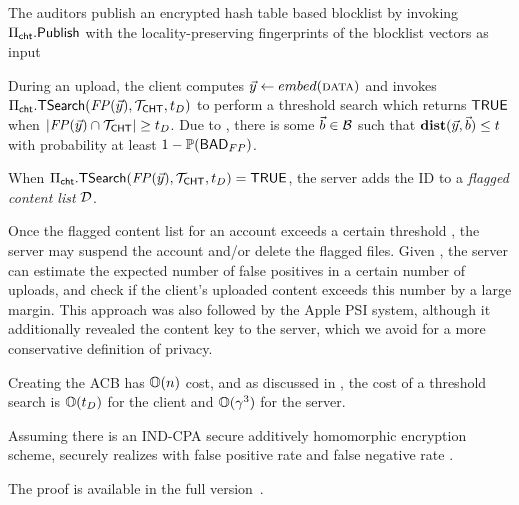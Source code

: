 \enumListStart
 
\item The auditors publish an encrypted hash table based blocklist by invoking $\Pi_{\mathsf{cht}}.\mathsf{Publish}$ with the locality-preserving fingerprints of the blocklist vectors as input
\item During an upload, the client computes $\clientVec \assign \embed(\clientData)$ and invokes $\chtACB.\thresholdSearchBlocklist(\fingerprint(\clientVec), \chtBlklistToken, \detectionThreshold)$ to perform a threshold search which returns $\mathsf{TRUE}$ when 
$|\fingerprint(\clientVec) \cap \chtBlklistToken| \ge \detectionThreshold$. Due to , there is some $\blocklistVec \in \blocklist$ such that $\hammingDist{\clientVec}{\blocklistVec} \le \threshold$ with probability at least $1 - \mathbb{P}\mathopen{}\left({\mathsf{BAD}_{FP}}\right)\mathclose{}$. 

\item When $\chtACB.\thresholdSearchBlocklist(\fingerprint(\clientVec), \chtBlklistToken, \detectionThreshold) = \tru$, the server adds the ID to a \emph{flagged content list} $\mathcal{D}$. 

\enumListEnd

Once the flagged content list for an account exceeds a certain threshold \revealThreshold, the server may suspend the account and/or delete the flagged files. Given \badFP, the server can estimate the expected number of false positives in a certain number of uploads, and check if the client's uploaded content exceeds this number by a large margin. This approach was also followed by the Apple PSI system, although it additionally revealed the content key to the server, which we avoid for a more conservative definition of privacy. 

%
Creating the ACB has $\mathbb{O}(n)$ cost, and as discussed in , the cost of a threshold search is $\mathbb{O}(t_{D})$ for the client and $\mathbb{O}(\gamma^3)$ for the server.   
\begin{theorem}
Assuming there is an IND-CPA secure additively homomorphic encryption scheme, \protocolFM securely realizes \contentModFuncExact with false positive rate \badFP and false negative rate \badFN. 
\end{theorem}

The proof is available in the full version~\cite{code}.


